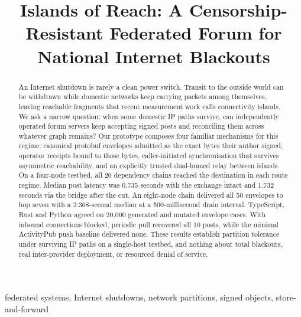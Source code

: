 \documentclass[conference,a4paper,10pt]{IEEEtran}
\begin{document}
\title{Islands of Reach: A Censorship-Resistant Federated Forum for
National Internet Blackouts}

\author{%
}

\maketitle
\thispagestyle{iccitfirstpage}

\begin{abstract}
  An Internet shutdown is rarely a clean power switch. Transit to the outside world can be withdrawn while domestic networks keep carrying packets among themselves, leaving reachable fragments that recent measurement work calls connectivity islands. We ask a narrow question: when some domestic IP paths survive, can independently operated forum servers keep accepting signed posts and reconciling them across whatever graph remains? Our prototype composes four familiar mechanisms for this regime: canonical protobuf envelopes admitted as the exact bytes their author signed, operator receipts bound to those bytes, caller-initiated synchronisation that survives asymmetric reachability, and an explicitly trusted dual-homed relay between islands. On a four-node testbed, all 20 dependency chains reached the destination in each route regime. Median post latency was 0.735 seconds with the exchange intact and 1.732 seconds via the bridge after the cut. An eight-node chain delivered all 50 envelopes to hop seven with a 2.368-second median at a 500-millisecond drain interval. TypeScript, Rust and Python agreed on 20,000 generated and mutated envelope cases. With inbound connections blocked, periodic pull recovered all 10 posts, while the minimal ActivityPub push baseline delivered none. These results establish partition tolerance under surviving IP paths on a single-host testbed, and nothing about total blackouts, real inter-provider deployment, or resourced denial of service.
\end{abstract}

\begin{IEEEkeywords}
  federated systems, Internet shutdowns, network partitions, signed objects, store-and-forward
\end{IEEEkeywords}
\end{document}
